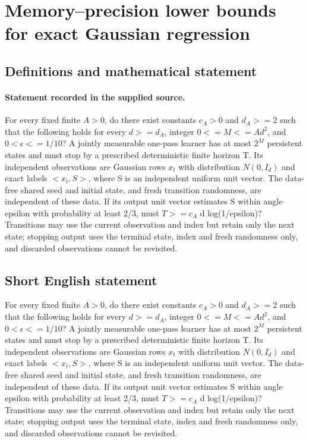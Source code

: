 \documentclass[11pt]{article}
\begin{document}
\section*{Memory–precision lower bounds for exact Gaussian regression}\label{30007456}
\subsection{Definitions and mathematical statement}
\paragraph{Statement recorded in the supplied source.}
For every fixed finite $A>0$, do there exist constants $c_A>0$ and $d_A>=2$ such that the following holds for every $d>=d_A$, integer $0<=M<=Ad^2$, and $0<\epsilon <=1/10$? A jointly measurable one-pass learner has at most $2^M$ persistent states and must stop by a prescribed deterministic finite horizon T. Its independent observations are Gaussian rows $x_t$ with distribution $N(0,I_d)$ and exact labels $<x_t,S>$, where S is an independent uniform unit vector. The data-free shared seed and initial state, and fresh transition randomness, are independent of these data. If its output unit vector estimates S within angle epsilon with probability at least 2/3, must $T>=c_A$ d log(1/epsilon)? Transitions may use the current observation and index but retain only the next state; stopping output uses the terminal state, index and fresh randomness only, and discarded observations cannot be revisited.
\subsection{Short English statement}
For every fixed finite $A>0$, do there exist constants $c_A>0$ and $d_A>=2$ such that the following holds for every $d>=d_A$, integer $0<=M<=Ad^2$, and $0<\epsilon <=1/10$? A jointly measurable one-pass learner has at most $2^M$ persistent states and must stop by a prescribed deterministic finite horizon T. Its independent observations are Gaussian rows $x_t$ with distribution $N(0,I_d)$ and exact labels $<x_t,S>$, where S is an independent uniform unit vector. The data-free shared seed and initial state, and fresh transition randomness, are independent of these data. If its output unit vector estimates S within angle epsilon with probability at least 2/3, must $T>=c_A$ d log(1/epsilon)? Transitions may use the current observation and index but retain only the next state; stopping output uses the terminal state, index and fresh randomness only, and discarded observations cannot be revisited.
\end{document}
